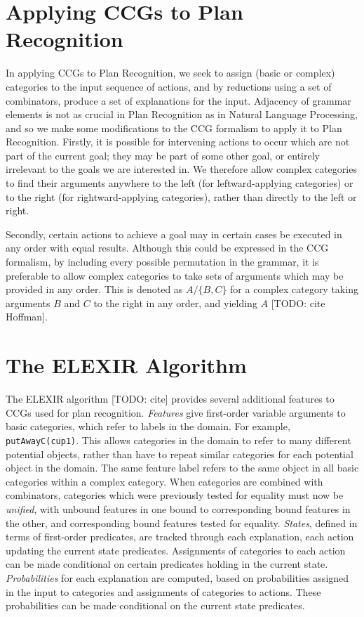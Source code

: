 \section{Applying CCGs to Plan Recognition}

In applying CCGs to Plan Recognition, we seek to assign (basic or complex) categories to the input sequence of actions, and by reductions using a set of combinators, produce a set of explanations for the input. Adjacency of grammar elements is not as crucial in Plan Recognition as in Natural Language Processing, and so we make some modifications to the CCG formalism to apply it to Plan Recognition.
Firstly, it is possible for intervening actions to occur which are not part of the current goal; they may be part of some other goal, or entirely irrelevant to the goals we are interested in. We therefore allow complex categories to find their arguments anywhere to the left (for leftward-applying categories) or to the right (for rightward-applying categories), rather than directly to the left or right.

Secondly, certain actions to achieve a goal may in certain cases be executed in any order with equal results. Although this could be expressed in the CCG formalism, by including every possible permutation in the grammar, it is preferable to allow complex categories to take sets of arguments which may be provided in any order. This is denoted as $A/\{B, C\}$ for a complex category taking arguments $B$ and $C$ to the right in any order, and yielding $A$ [TODO: cite Hoffman].

\section{The ELEXIR Algorithm}

The ELEXIR algorithm [TODO: cite] provides several additional features to CCGs used for plan recognition. \emph{Features} give first-order variable arguments to basic categories, which refer to labels in the domain. For example, \texttt{putAwayC(cup1)}. This allows categories in the domain to refer to many different potential objects, rather than have to repeat similar categories for each potential object in the domain. The same feature label refers to the same object in all basic categories within a complex category. When categories are combined with combinators, categories which were previously tested for equality must now be \emph{unified}, with unbound features in one bound to corresponding bound features in the other, and corresponding bound features tested for equality. \emph{States}, defined in terms of first-order predicates, are tracked through each explanation, each action updating the current state predicates. Assignments of categories to each action can be made conditional on certain 
predicates holding in the current state. \emph{Probabilities} for each explanation are computed, based on probabilities assigned in the input to categories and assignments of categories to actions. These probabilities can be made conditional on the current state predicates.

